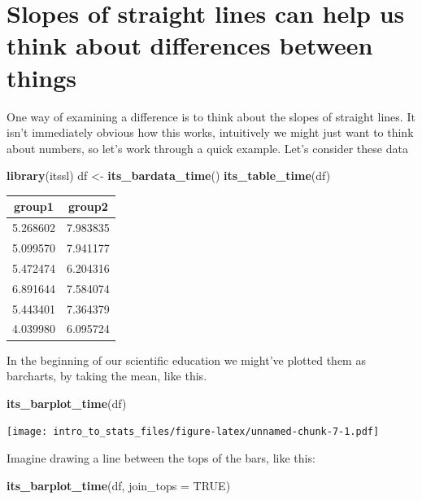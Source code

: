 \documentclass[
]{book}
\newenvironment{Shaded}{\begin{snugshade}}{\end{snugshade}}
\newcommand{\DataTypeTok}[1]{\textcolor[rgb]{0.13,0.29,0.53}{#1}}
\newcommand{\KeywordTok}[1]{\textcolor[rgb]{0.13,0.29,0.53}{\textbf{#1}}}
\newcommand{\NormalTok}[1]{#1}
\newcommand{\OtherTok}[1]{\textcolor[rgb]{0.56,0.35,0.01}{#1}}
\newcommand{\StringTok}[1]{\textcolor[rgb]{0.31,0.60,0.02}{#1}}
\begin{document}
\hypertarget{slopes-of-straight-lines-can-help-us-think-about-differences-between-things}{%
\section{Slopes of straight lines can help us think about differences between things}\label{slopes-of-straight-lines-can-help-us-think-about-differences-between-things}}

One way of examining a difference is to think about the slopes of straight lines. It isn't immediately obvious how this works, intuitively we might just want to think about numbers, so let's work through a quick example. Let's consider these data

\begin{Shaded}
\begin{Highlighting}[]
\KeywordTok{library}\NormalTok{(itssl)}
\NormalTok{df <-}\StringTok{ }\KeywordTok{its_bardata_time}\NormalTok{()}
\KeywordTok{its_table_time}\NormalTok{(df)}
\end{Highlighting}
\end{Shaded}

\begin{tabular}{c|c}
\hline
group1 & group2\\
\hline
5.268602 & 7.983835\\
\hline
5.099570 & 7.941177\\
\hline
5.472474 & 6.204316\\
\hline
6.891644 & 7.584074\\
\hline
5.443401 & 7.364379\\
\hline
4.039980 & 6.095724\\
\hline
\end{tabular}

In the beginning of our scientific education we might've plotted them as barcharts, by taking the mean, like this.

\begin{Shaded}
\begin{Highlighting}[]
\KeywordTok{its_barplot_time}\NormalTok{(df)}
\end{Highlighting}
\end{Shaded}

\texttt{[image: intro\_to\_stats\_files/figure-latex/unnamed-chunk-7-1.pdf]}

Imagine drawing a line between the tops of the bars, like this:

\begin{Shaded}
\begin{Highlighting}[]
\KeywordTok{its_barplot_time}\NormalTok{(df, }\DataTypeTok{join_tops =} \OtherTok{TRUE}\NormalTok{)}
\end{Highlighting}
\end{Shaded}
\end{document}
